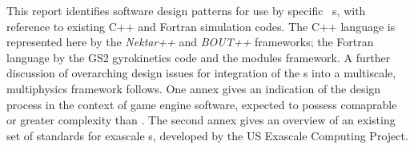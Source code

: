 This report identifies software design patterns for use by specific \nep\ \papp s, with reference to existing C++ and Fortran simulation codes.  
The C++ language is represented here by the {\it Nektar++} and {\it BOUT++} frameworks; the Fortran language by the GS2 gyrokinetics code and the  modules framework.
A further discussion of overarching design issues for integration of the \papp s into a multiscale, multiphysics framework follows. 
One annex gives an indication of the design process in the context of game engine software, expected
to possess comaprable or greater complexity than \nep.
The second  annex gives an overview of 
an existing set of standards for exascale \papp s, developed by the US Exascale Computing Project.
